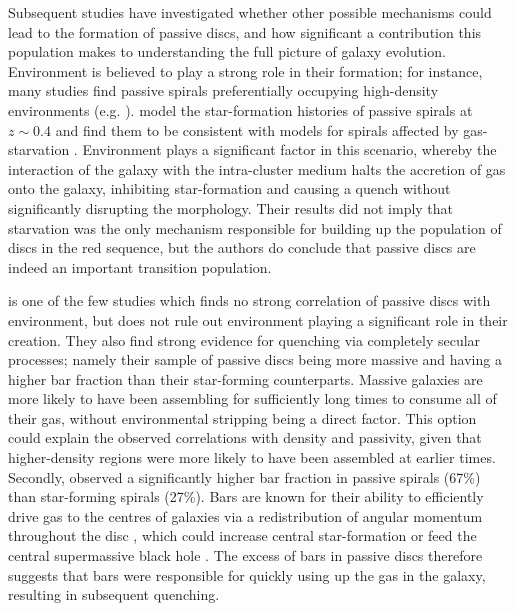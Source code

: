 \documentclass[useAMS,usenatbib]{mn2e}
\begin{document}
Subsequent studies have investigated whether other possible mechanisms could lead to the formation of passive discs, and how significant a contribution this population makes to understanding the full picture of galaxy evolution. Environment is believed to play a strong role in their formation; for instance, many studies find passive spirals preferentially occupying high-density environments (e.g. \citet{Dressler1999, Poggianti1999, Goto2003, Deng2009, Hughes2009, Fraser-McKelvie2017}). \citet{Moran2006} model the star-formation histories of passive spirals at $z\sim0.4$ and find them to be consistent with models for spirals affected by gas-starvation \citep{Larson1980, Quilis2000, Bekki2002}. Environment plays a significant factor in this scenario, whereby the interaction of the galaxy with the intra-cluster medium halts the accretion of gas onto the galaxy, inhibiting star-formation and causing a quench without significantly disrupting the morphology. Their results did not imply that starvation was the only mechanism responsible for building up the population of discs in the red sequence, but the authors do conclude that passive discs are indeed an important transition population.

\citet{Masters2010} is one of the few studies which finds no strong correlation of passive discs with environment, but does not rule out environment playing a significant role in their creation. They also find strong evidence for quenching via completely secular processes; namely their sample of passive discs being more massive and having a higher bar fraction than their star-forming counterparts. Massive galaxies are more likely to have been assembling for sufficiently long times to consume all of their gas, without environmental stripping being a direct factor. This option could explain the observed correlations with density and passivity, given that higher-density regions were more likely to have been assembled at earlier times. Secondly, \citet{Masters2010} observed a significantly higher bar fraction in passive spirals (67\%) than star-forming spirals (27\%). Bars are known for their ability to efficiently drive gas to the centres of galaxies via a redistribution of angular momentum throughout the disc \citep{Sellwood1993,Shlosman1989,Ann2005}, which could increase central star-formation \citep{Hawarden1986,Ho1997} or feed the central supermassive black hole \citep{Athanassoula1992,Friedli1993,Galloway2015}. The excess of bars in passive discs therefore suggests that bars were responsible for quickly using up the gas in the galaxy, resulting in subsequent quenching. 
\end{document}
